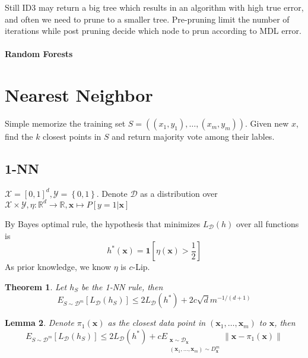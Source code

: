 \documentclass{book}
\newcommand{\R}{\mathbb{R}}
\newcommand{\nm}[1]{\left\|#1\right\|}
\newcommand{\D}{\mathcal{D}}
\newtheorem{Thm}{Theorem}[section]
\newtheorem{Lemma}[Thm]{Lemma}
\begin{document}
Still ID3 may return a big tree which results in an algorithm with high true error, and often we need to prune to a smaller tree. Pre-pruning limit the number of iterations while post pruning decide which node to prun according to MDL error.

\paragraph{Random Forests}

\section{Nearest Neighbor}
Simple memorize the training set $S=\left( (x_1,y_1),\dots, (x_m,y_m) \right)$. Given new $x$, find the $k$ closest points in $S$ and return majority vote among their lables.

\subsection{1-NN}
$\mathcal{X}=\left[ 0,1 \right]^d, \mathcal{Y}=\left\{ 0,1 \right\}$. Denote $\D$ as a distribution over $\mathcal{X}\times \mathcal{Y},\eta:\R^d\to \R, \mathbf{x}\mapsto P\left[ y=1|\mathbf{x} \right]$

By Bayes optimal rule, the hypothesis that minimizes $L_{\D}(h)$ over all functions is 
\begin{equation}
h^{*}(\mathbf{x})=\mathbf{1}\left[ \eta(\mathbf{x})> \frac{1}{2} \right]
\end{equation}
As prior knowledge, we know $\eta$ is $c$-Lip.
\begin{Thm}
  Let $h_S$ be the 1-NN rule, then 
\begin{equation}
E_{S\sim \D^m}\left[ L_{\D}(h_S)\right] \leq 2L_{\D}(h^{*})+2c \sqrt{d}m^{-1/(d+1)} 
\end{equation}
\end{Thm}

\begin{Lemma}
Denote $\pi_1(\mathbf{x})$ as the closest data point in $\left( \mathbf{x}_1,\dots, \mathbf{x}_m \right)$ to $\mathbf{x}$, then 
\begin{equation}
E_{S\sim \D^m}\left[ L_{\D}(h_S) \right]\leq 2L_{\D}(h^{*})+c E_{\substack{\mathbf{x}\sim \D_{\mathbf{x}}\\ \left( \mathbf{x}_1,\dots,\mathbf{x}_m \right)\sim D^m_{\mathbf{x}}}}\nm{\mathbf{x}-\pi_1(\mathbf{x})}
\end{equation}
\end{Lemma}
\end{document}
